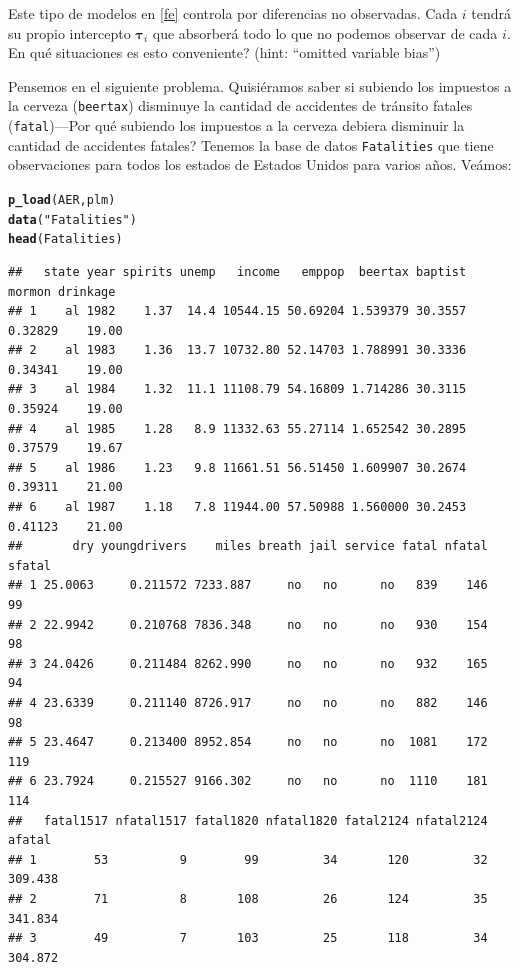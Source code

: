 \documentclass[onesided]{article}\usepackage[]{graphicx}\usepackage[]{color}
\makeatletter
\newcommand{\hlstr}[1]{\textcolor[rgb]{0.192,0.494,0.8}{#1}}%
\newcommand{\hlstd}[1]{\textcolor[rgb]{0.345,0.345,0.345}{#1}}%
\newcommand{\hlkwd}[1]{\textcolor[rgb]{0.737,0.353,0.396}{\textbf{#1}}}%
\newenvironment{kframe}{%
 \def\at@end@of@kframe{}%
 \ifinner\ifhmode%
  \def\at@end@of@kframe{\end{minipage}}%
  \begin{minipage}{\columnwidth}%
 \fi\fi%
 \def\FrameCommand##1{\hskip\@totalleftmargin \hskip-\fboxsep
 \colorbox{shadecolor}{##1}\hskip-\fboxsep
     \hskip-\linewidth \hskip-\@totalleftmargin \hskip\columnwidth}%
 \MakeFramed {\advance\hsize-\width
   \@totalleftmargin\z@ \linewidth\hsize
   \@setminipage}}%
 {\par\unskip\endMakeFramed%
 \at@end@of@kframe}
\newenvironment{knitrout}{}{} %
\makeatother
\begin{document}
Este tipo de modelos en \autoref{fe} controla por diferencias no observadas. Cada $i$ tendr\'a su propio intercepto ${\mathbf \tau}_{i}$ que absorber\'a todo lo que no podemos observar de cada $i$. {\color{red}En qu\'e situaciones es esto conveniente?} (hint: ``omitted variable bias'')

Pensemos en el siguiente problema. Quisi\'eramos saber si subiendo los impuestos a la cerveza (\texttt{beertax}) disminuye la cantidad de accidentes de tr\'ansito fatales (\texttt{fatal})---{\color{red}Por qu\'e subiendo los impuestos a la cerveza debiera disminuir la cantidad de accidentes fatales?} Tenemos la base de datos \texttt{Fatalities} que tiene observaciones para todos los estados de Estados Unidos para varios a\~nos. Ve\'amos:

\begin{knitrout}
\color{fgcolor}\begin{kframe}
\begin{alltt}
\hlkwd{p_load}\hlstd{(AER, plm)}
\hlkwd{data}\hlstd{(}\hlstr{"Fatalities"}\hlstd{)}
\hlkwd{head}\hlstd{(Fatalities)}
\end{alltt}
\begin{verbatim}
##   state year spirits unemp   income   emppop  beertax baptist  mormon drinkage
## 1    al 1982    1.37  14.4 10544.15 50.69204 1.539379 30.3557 0.32829    19.00
## 2    al 1983    1.36  13.7 10732.80 52.14703 1.788991 30.3336 0.34341    19.00
## 3    al 1984    1.32  11.1 11108.79 54.16809 1.714286 30.3115 0.35924    19.00
## 4    al 1985    1.28   8.9 11332.63 55.27114 1.652542 30.2895 0.37579    19.67
## 5    al 1986    1.23   9.8 11661.51 56.51450 1.609907 30.2674 0.39311    21.00
## 6    al 1987    1.18   7.8 11944.00 57.50988 1.560000 30.2453 0.41123    21.00
##       dry youngdrivers    miles breath jail service fatal nfatal sfatal
## 1 25.0063     0.211572 7233.887     no   no      no   839    146     99
## 2 22.9942     0.210768 7836.348     no   no      no   930    154     98
## 3 24.0426     0.211484 8262.990     no   no      no   932    165     94
## 4 23.6339     0.211140 8726.917     no   no      no   882    146     98
## 5 23.4647     0.213400 8952.854     no   no      no  1081    172    119
## 6 23.7924     0.215527 9166.302     no   no      no  1110    181    114
##   fatal1517 nfatal1517 fatal1820 nfatal1820 fatal2124 nfatal2124  afatal
## 1        53          9        99         34       120         32 309.438
## 2        71          8       108         26       124         35 341.834
## 3        49          7       103         25       118         34 304.872

\end{verbatim}
\end{kframe}
\end{knitrout}
\end{document}
